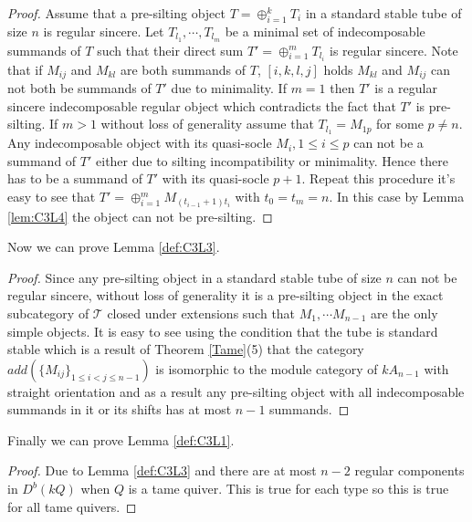\begin{proof}
\indent Assume that a pre-silting object $T=\oplus_{i=1}^k T_i$ in a standard stable tube of size $n$ is regular sincere. Let $T_{l_1},\cdots, T_{l_m}$ be a minimal set of indecomposable summands of $T$ such that their direct sum $T'=\oplus_{i=1}^m T_{l_i}$ is regular sincere. Note that if $M_{ij}$ and $M_{kl}$ are both summands of $T$, $[i,k,l,j]$ holds $M_{kl}$ and $M_{ij}$ can not both be summands of $T'$ due to minimality. If $m=1$ then $T'$ is a regular sincere indecomposable regular object which contradicts the fact that $T'$ is pre-silting. If $m>1$ without loss of generality assume that $T_{l_1}=M_{1p}$ for some $p\neq n$. Any indecomposable object with its quasi-socle $M_i, 1\leq i\leq p$ can not be a summand of $T'$ either due to silting incompatibility or minimality. Hence there has to be a summand of $T'$ with its quasi-socle $p+1$. Repeat this procedure it's easy to see that $T'=\oplus_{i=1}^m M_{(t_{i-1}+1)t_i}$ with $t_0=t_m=n$. In this case by Lemma \ref{lem:C3L4} the object can not be pre-silting.
\end{proof}
\indent Now we can prove Lemma \ref{def:C3L3}.
\begin{proof}
\indent Since any pre-silting object in a standard stable tube of size $n$ can not be regular sincere, without loss of generality it is a pre-silting object in the exact subcategory of $\mathcal{T}$ closed under extensions such that $M_1,\cdots M_{n-1}$ are the only simple objects. It is easy to see using the condition that the tube is standard stable which is a result of Theorem \ref{Tame}(5) that the category $add(\{M_{ij}\}_{1\leq i < j\leq n-1})$ is isomorphic to the module category of $kA_{n-1}$ with straight orientation and as a result any pre-silting object with all indecomposable summands in it or its shifts has at most $n-1$ summands. 
\end{proof}
\indent Finally we can prove Lemma \ref{def:C3L1}.
\begin{proof}
\indent Due to Lemma \ref{def:C3L3} and \cite{DR76} there are at most $n-2$ regular components in $D^b(kQ)$ when $Q$ is a tame quiver. This is true for each type so this is true for all tame quivers.
\end{proof}
